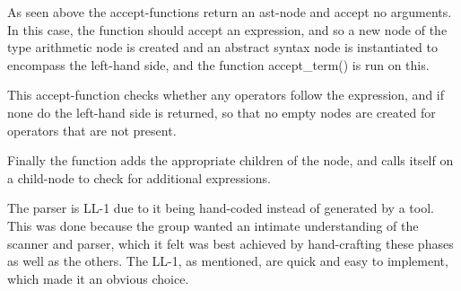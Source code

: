 As seen above the accept-functions return an \ac{ast}-node and accept no arguments. In this case, the function should accept an expression, and so a new node of the type arithmetic node is created and an abstract syntax node is instantiated to encompass the left-hand side, and the function accept\_term() is run on this.

This accept-function checks whether any operators follow the expression, and if none do the left-hand side is returned, so that no empty nodes are created for operators that are not present.

Finally the function adds the appropriate children of the node, and calls itself on a child-node to check for additional expressions.

The parser is LL-1 due to it being hand-coded instead of generated by a tool. This was done because the group wanted an intimate understanding of the scanner and parser, which it felt was best achieved by hand-crafting these phases as well as the others. The LL-1, as mentioned, are quick and easy to implement, which made it an obvious choice.
